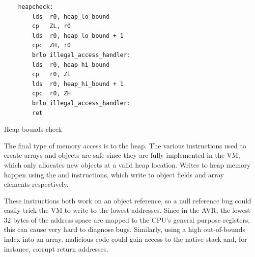 \begin{listing}
	\centering
 	\begin{verbatim}
    heapcheck:
        lds  r0, heap_lo_bound
        cp   ZL, r0
        lds  r0, heap_lo_bound + 1
        cpc  ZH, r0
        brlo illegal_access_handler:
        lds  r0, heap_hi_bound
        cp   r0, ZL
        lds  r0, heap_hi_bound + 1
        cpc  r0, ZH
        brlo illegal_access_handler:
        ret
	\end{verbatim}
	\caption{Heap bounds check}
	\label{lst-heap-bounds-check}
\end{listing}



The final type of memory access is to the heap. The various  instructions used to create arrays and objects are safe since they are fully implemented in the VM, which only allocates new objects at a valid heap location. Writes to heap memory happen using the  and  instructions, which write to object fields and array elements respectively. 

These instructions both work on an object reference, so a null reference bug could easily trick the VM to write to the lowest addresses. Since in the AVR, the lowest 32 bytes of the address space are mapped to the CPU's general purpose registers, this can cause very hard to diagnose bugs. Similarly, using a high out-of-bounds index into an array, malicious code could gain access to the native stack and, for instance, corrupt return addresses.

